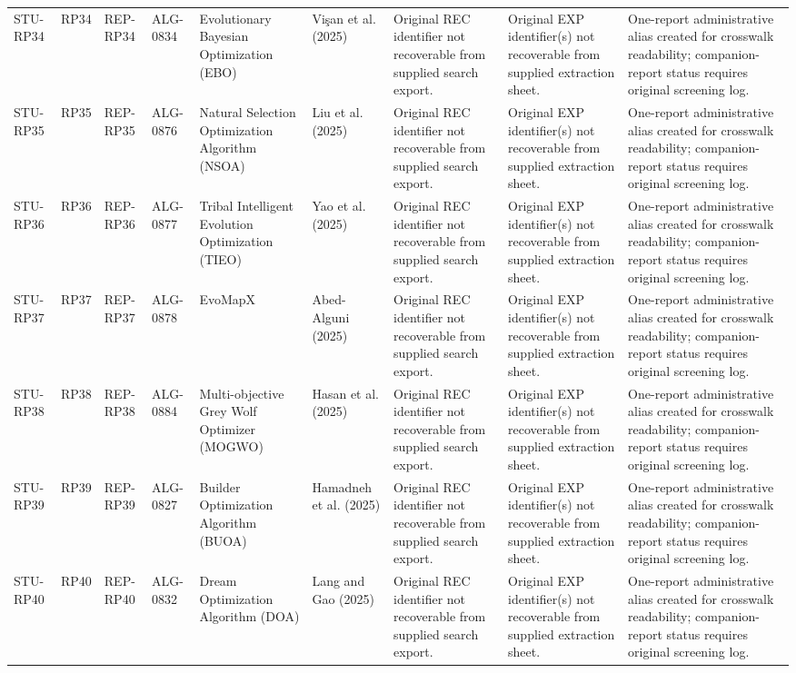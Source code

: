 \documentclass[9pt]{article}
\begin{document}
\begin{landscape}
\begin{longtable}{P{1.5cm}P{1.0cm}P{1.8cm}P{1.8cm}P{5.2cm}P{4.3cm}P{3.4cm}P{3.3cm}P{3.0cm}}
STU-RP34 & RP34 & REP-RP34 & ALG-0834 & Evolutionary Bayesian Optimization (EBO) & Vişan et al. (2025) & Original REC identifier not recoverable from supplied search export. & Original EXP identifier(s) not recoverable from supplied extraction sheet. & One-report administrative alias created for crosswalk readability; companion-report status requires original screening log. \\
STU-RP35 & RP35 & REP-RP35 & ALG-0876 & Natural Selection Optimization Algorithm (NSOA) & Liu et al. (2025) & Original REC identifier not recoverable from supplied search export. & Original EXP identifier(s) not recoverable from supplied extraction sheet. & One-report administrative alias created for crosswalk readability; companion-report status requires original screening log. \\
STU-RP36 & RP36 & REP-RP36 & ALG-0877 & Tribal Intelligent Evolution Optimization (TIEO) & Yao et al. (2025) & Original REC identifier not recoverable from supplied search export. & Original EXP identifier(s) not recoverable from supplied extraction sheet. & One-report administrative alias created for crosswalk readability; companion-report status requires original screening log. \\
STU-RP37 & RP37 & REP-RP37 & ALG-0878 & EvoMapX & Abed-Alguni (2025) & Original REC identifier not recoverable from supplied search export. & Original EXP identifier(s) not recoverable from supplied extraction sheet. & One-report administrative alias created for crosswalk readability; companion-report status requires original screening log. \\
STU-RP38 & RP38 & REP-RP38 & ALG-0884 & Multi-objective Grey Wolf Optimizer (MOGWO) & Hasan et al. (2025) & Original REC identifier not recoverable from supplied search export. & Original EXP identifier(s) not recoverable from supplied extraction sheet. & One-report administrative alias created for crosswalk readability; companion-report status requires original screening log. \\
STU-RP39 & RP39 & REP-RP39 & ALG-0827 & Builder Optimization Algorithm (BUOA) & Hamadneh et al. (2025) & Original REC identifier not recoverable from supplied search export. & Original EXP identifier(s) not recoverable from supplied extraction sheet. & One-report administrative alias created for crosswalk readability; companion-report status requires original screening log. \\
STU-RP40 & RP40 & REP-RP40 & ALG-0832 & Dream Optimization Algorithm (DOA) & Lang and Gao (2025) & Original REC identifier not recoverable from supplied search export. & Original EXP identifier(s) not recoverable from supplied extraction sheet. & One-report administrative alias created for crosswalk readability; companion-report status requires original screening log. \\

\end{longtable}
\end{landscape}
\end{document}
